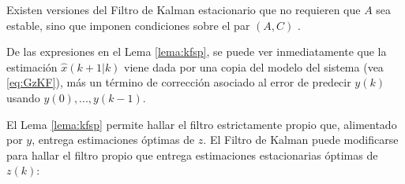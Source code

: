 \begin{obs}
Existen versiones del Filtro de Kalman estacionario que no requieren que $A$ sea estable, sino que imponen condiciones sobre el par $(A,C)$ \cite{kwasiv72}.
\end{obs}

De las expresiones en el Lema \ref{lema:kfsp}, se puede ver inmediatamente que la estimaci\'on $\hat{x}(k+1|k)$ viene dada por una copia del modelo del sistema (vea \eqref{eq:GzKF}), m\'as un t\'ermino de correcci\'on asociado al error de predecir $y(k)$ usando $y(0),...,y(k-1)$.

El Lema \ref{lema:kfsp} permite hallar el filtro estrictamente propio que, alimentado por $y$, entrega estimaciones \'optimas de $z$. El Filtro de Kalman puede modificarse para hallar el filtro propio que entrega estimaciones estacionarias \'optimas de $z(k)$:

